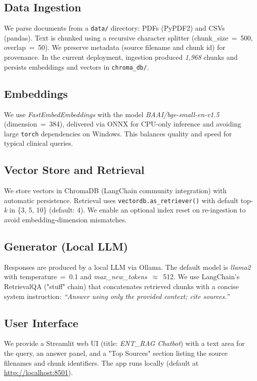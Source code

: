 \documentclass[conference]{IEEEtran}
\begin{document}
\subsection{Data Ingestion}
We parse documents from a \texttt{data/} directory: PDFs (PyPDF2) and CSVs (pandas). Text is chunked using a recursive character splitter (chunk\_size~=~500, overlap~=~50). We preserve metadata (source filename and chunk id) for provenance. In the current deployment, ingestion produced \emph{1{,}968} chunks and persists embeddings and vectors in \texttt{chroma\_db/}.

\subsection{Embeddings}
We use \emph{FastEmbedEmbeddings} with the model \emph{BAAI/bge-small-en-v1.5} (dimension~=~384), delivered via ONNX for CPU-only inference and avoiding large \texttt{torch} dependencies on Windows. This balances quality and speed for typical clinical queries.

\subsection{Vector Store and Retrieval}
We store vectors in ChromaDB (LangChain community integration) with automatic persistence. Retrieval uses \texttt{vectordb.as\_retriever()} with default top-\emph{k} in \{3, 5, 10\} (default: 4). We enable an optional index reset on re-ingestion to avoid embedding-dimension mismatches.

\subsection{Generator (Local LLM)}
Responses are produced by a local LLM via Ollama. The default model is \emph{llama2} with temperature~=~0.1 and \emph{max\_new\_tokens}~$\approx$~512. We use LangChain's RetrievalQA ("stuff" chain) that concatenates retrieved chunks with a concise system instruction: \emph{``Answer using only the provided context; cite sources.''}

\subsection{User Interface}
We provide a Streamlit web UI (title: \emph{ENT\_RAG Chatbot}) with a text area for the query, an answer panel, and a "Top Sources" section listing the source filenames and chunk identifiers. The app runs locally (default at \url{http://localhost:8501}).
\end{document}
